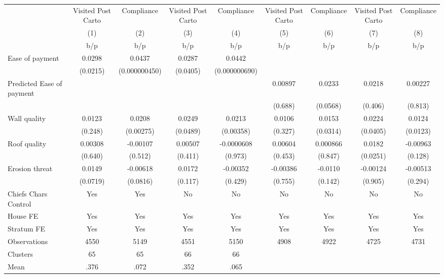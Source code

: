 {
\def\sym#1{\ifmmode^{#1}\else\(^{#1}\)\fi}
\begin{tabular}{l*{8}{c}}
\toprule
                &\multicolumn{1}{c}{Visited Post Carto}&\multicolumn{1}{c}{Compliance}&\multicolumn{1}{c}{Visited Post Carto}&\multicolumn{1}{c}{Compliance}&\multicolumn{1}{c}{Visited Post Carto}&\multicolumn{1}{c}{Compliance}&\multicolumn{1}{c}{Visited Post Carto}&\multicolumn{1}{c}{Compliance}\\
                &\multicolumn{1}{c}{(1)}&\multicolumn{1}{c}{(2)}&\multicolumn{1}{c}{(3)}&\multicolumn{1}{c}{(4)}&\multicolumn{1}{c}{(5)}&\multicolumn{1}{c}{(6)}&\multicolumn{1}{c}{(7)}&\multicolumn{1}{c}{(8)}\\
                &      b/p&      b/p&      b/p&      b/p&      b/p&      b/p&      b/p&      b/p\\
\midrule
Ease of payment &   0.0298&   0.0437&   0.0287&   0.0442&         &         &         &         \\
                & (0.0215)&(0.000000450)& (0.0405)&(0.000000690)&         &         &         &         \\
Predicted Ease of payment&         &         &         &         &  0.00897&   0.0233&   0.0218&  0.00227\\
                &         &         &         &         &  (0.688)& (0.0568)&  (0.406)&  (0.813)\\
Wall quality    &   0.0123&   0.0208&   0.0249&   0.0213&   0.0106&   0.0153&   0.0224&   0.0124\\
                &  (0.248)&(0.00275)& (0.0489)&(0.00358)&  (0.327)& (0.0314)& (0.0405)& (0.0123)\\
Roof quality    &  0.00308& -0.00107&  0.00507&-0.0000608&  0.00604& 0.000866&   0.0182& -0.00963\\
                &  (0.640)&  (0.512)&  (0.411)&  (0.973)&  (0.453)&  (0.847)& (0.0251)&  (0.128)\\
Erosion threat  &   0.0149& -0.00618&   0.0172& -0.00352& -0.00386&  -0.0110& -0.00124& -0.00513\\
                & (0.0719)& (0.0816)&  (0.117)&  (0.429)&  (0.755)&  (0.142)&  (0.905)&  (0.294)\\
Chiefs Chars Control &      Yes&      Yes&       No&       No&       No&       No&       No&       No\\
House FE        &      Yes&      Yes&      Yes&      Yes&      Yes&      Yes&      Yes&      Yes\\
Stratum FE      &      Yes&      Yes&      Yes&      Yes&      Yes&      Yes&      Yes&      Yes\\
\midrule
Observations    &     4550&     5149&     4551&     5150&     4908&     4922&     4725&     4731\\
Clusters        &       65&       65&       66&       66&         &         &         &         \\
Mean            &     .376&     .072&     .352&     .065&         &         &         &         \\
\bottomrule
\end{tabular}
}
